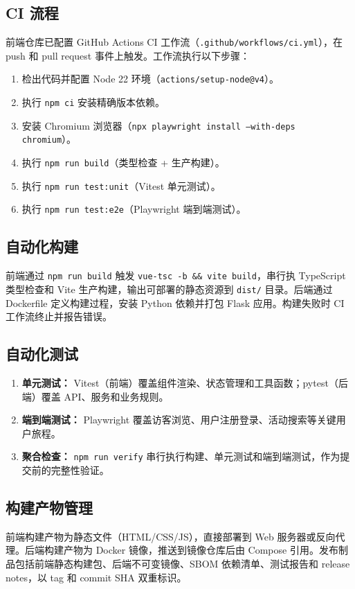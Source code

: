 \documentclass[12pt,a4paper]{ctexart}
\begin{document}
\subsection{CI 流程}
前端仓库已配置 GitHub Actions CI 工作流（\texttt{.github/workflows/ci.yml}），在 push 和 pull request 事件上触发。工作流执行以下步骤：
\begin{enumerate}
\item 检出代码并配置 Node 22 环境（\texttt{actions/setup-node@v4}）。
\item 执行 \texttt{npm ci} 安装精确版本依赖。
\item 安装 Chromium 浏览器（\texttt{npx playwright install --with-deps chromium}）。
\item 执行 \texttt{npm run build}（类型检查 + 生产构建）。
\item 执行 \texttt{npm run test:unit}（Vitest 单元测试）。
\item 执行 \texttt{npm run test:e2e}（Playwright 端到端测试）。
\end{enumerate}

\subsection{自动化构建}
前端通过 \texttt{npm run build} 触发 \texttt{vue-tsc -b \&\& vite build}，串行执 TypeScript 类型检查和 Vite 生产构建，输出可部署的静态资源到 \texttt{dist/} 目录。后端通过 Dockerfile 定义构建过程，安装 Python 依赖并打包 Flask 应用。构建失败时 CI 工作流终止并报告错误。

\subsection{自动化测试}
\begin{enumerate}
\item \textbf{单元测试：} Vitest（前端）覆盖组件渲染、状态管理和工具函数；pytest（后端）覆盖 API、服务和业务规则。
\item \textbf{端到端测试：} Playwright 覆盖访客浏览、用户注册登录、活动搜索等关键用户旅程。
\item \textbf{聚合检查：} \texttt{npm run verify} 串行执行构建、单元测试和端到端测试，作为提交前的完整性验证。
\end{enumerate}

\subsection{构建产物管理}
前端构建产物为静态文件（HTML/CSS/JS），直接部署到 Web 服务器或反向代理。后端构建产物为 Docker 镜像，推送到镜像仓库后由 Compose 引用。发布制品包括前端静态构建包、后端不可变镜像、SBOM 依赖清单、测试报告和 release notes，以 tag 和 commit SHA 双重标识。
\end{document}
